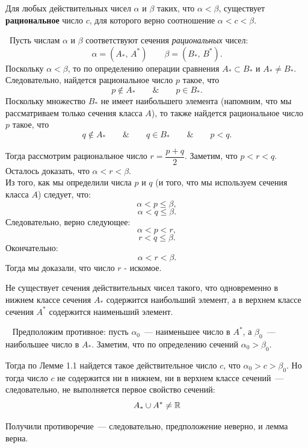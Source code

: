 \begin{lemma}
Для любых действительных чисел \(\alpha\) и \(\beta\) таких, что \(\alpha < \beta\), существует
\textbf{рациональное} число \(c\), для которого верно соотношение \(\alpha < c < \beta\).

\vspace{2mm}

\proofname~Пусть числам \(\alpha\) и \(\beta\) соответствуют сечения \textit{рациональных} чисел:
\[
\alpha = (A_{*}, \, A^{*}) \qquad \beta = (B_{*}, \, B^{*}).
\]
Поскольку \(\alpha < \beta\), то по определению операции сравнения \(A_{*} \subset B_{*}\)
и \(A_{*} \neq B_{*}\). Следовательно, найдется рациональное число \(p\) такое, что
\[
p \notin A_{*} \qquad \& \qquad p \in B_{*}.
\]
Поскольку множество \(B_{*}\) не имеет наибольшего элемента (напомним, что
мы рассматриваем только сечения класса \(A\)), то также найдется рациональное число \(p\)
такое, что
\[
q \notin A_{*} \qquad \& \qquad q \in B_{*} \qquad \& \qquad p < q.
\]

Тогда рассмотрим рациональное число \(r = \dfrac{p+q}{2}\). Заметим, что \(p < r < q\).
Осталось доказать, что \(\alpha < r < \beta\). \\

Из того, как мы определили числа \(p\) и \(q\) (и того, что мы используем сечения класса \(A\))
следует, что:
\[
\alpha < p \leq \beta,
\]
\[
\alpha < q \leq \beta.
\]
Следовательно, верно следующее:
\[
\alpha < p < r,
\]
\[
r < q \leq \beta.
\]
Окончательно:
\[
\alpha < r < \beta.
\]
Тогда мы доказали, что число \(r\) - искомое.~\qedsymbol
~\qedsymbol
\end{lemma}

\begin{lemma}
Не существует сечения действительных чисел такого,
что одновременно в нижнем классе сечения \(A_{*}\) содержится наибольший элемент,
а в верхнем классе сечения \(A^{*}\) содержится наименьший элемент.

\vspace{2mm}

\proofname~ Предположим противное: пусть \(\alpha_{0}\)~--- наименьшее число в \(A^{*}\), а
\(\beta_{0}\)~--- наибольшее число в \(A_{*}\). Заметим, что по определению сечений
\(\alpha_{0} > \beta_{0}\).

Тогда по Лемме 1.1 найдется такое действительное число \(c\), что
\(\alpha_{0} > c > \beta_{0}\). Но тогда число \(c\) не содержится ни в нижнем,
ни в верхнем классе сечений~--- следовательно, не выполняется первое свойство сечений:
\[
    A_{*}\cup A^{*} \neq \mathbb{R}
\]

Получили противоречие~--- следовательно, предположение неверно, и лемма верна.~\qedsymbol
\end{lemma}

